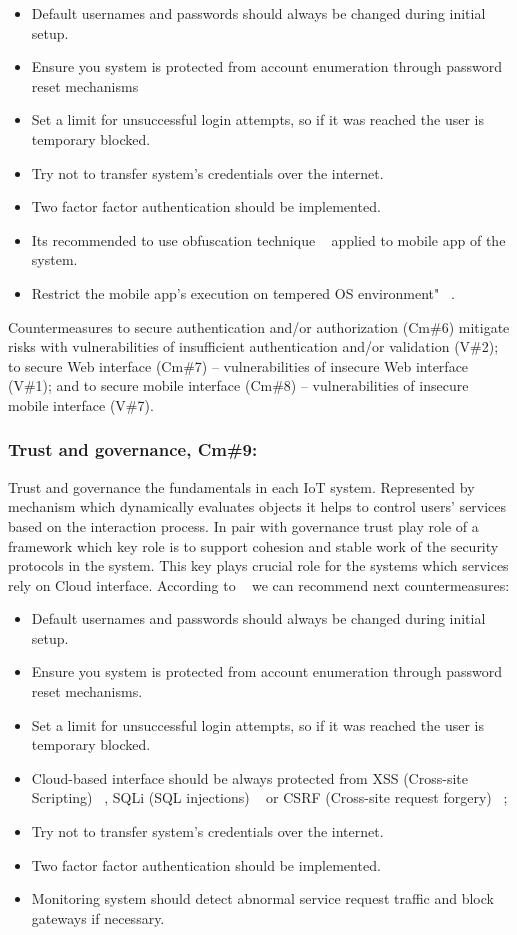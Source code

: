 \documentclass[12pt]{article}
\begin{document}
\begin{enumerate}
		\begin{itemize}
			\item Default usernames and passwords should always be changed during initial setup.
			\item Ensure you system is protected from account enumeration through password reset mechanisms
			\item Set a limit for unsuccessful login attempts, so if it was reached the user is temporary blocked.
			\item Try not to transfer system's credentials over the internet.
			\item Two factor factor authentication should be implemented.
			\item Its recommended to use obfuscation technique ~\cite{CO} applied to mobile app of the system.
			\item Restrict the mobile app's execution on tempered OS environment" ~\cite{OWASP}.
		\end{itemize}
\end{enumerate}

Countermeasures to secure authentication and/or authorization (Cm\#6) mitigate risks with vulnerabilities of insufficient authentication and/or validation (V\#2); to secure Web interface (Cm\#7) – vulnerabilities of insecure Web interface (V\#1); and to secure mobile interface (Cm\#8) – vulnerabilities of insecure mobile interface (V\#7).

\subsubsection{Trust and governance, Cm\#9:} 
Trust and governance the fundamentals in each IoT system. Represented by mechanism which dynamically  evaluates objects  it helps to control users' services based on the interaction process. In pair with governance trust play role of a framework which key role is to support cohesion and stable work of the security protocols in the system. This key plays crucial role for the systems which services rely on Cloud interface. According to ~\cite{OWASP} we can recommend next countermeasures:
\begin{itemize}
			\item Default usernames and passwords should always be changed during initial setup.
			\item Ensure you system is protected from account enumeration through password reset mechanisms.
			\item Set a limit for unsuccessful login attempts, so if it was reached the user is temporary blocked.
			\item Cloud-based interface should be always protected from XSS (Cross-site Scripting) ~\cite{XSS}, SQLi (SQL injections) ~\cite{SQLi} or CSRF (Cross-site request forgery) ~\cite{CSRF};
			\item Try not to transfer system's credentials over the internet.
			\item Two factor factor authentication should be implemented.
			\item Monitoring system should detect abnormal service request traffic and block gateways if necessary.
		\end{itemize}
\end{document}
